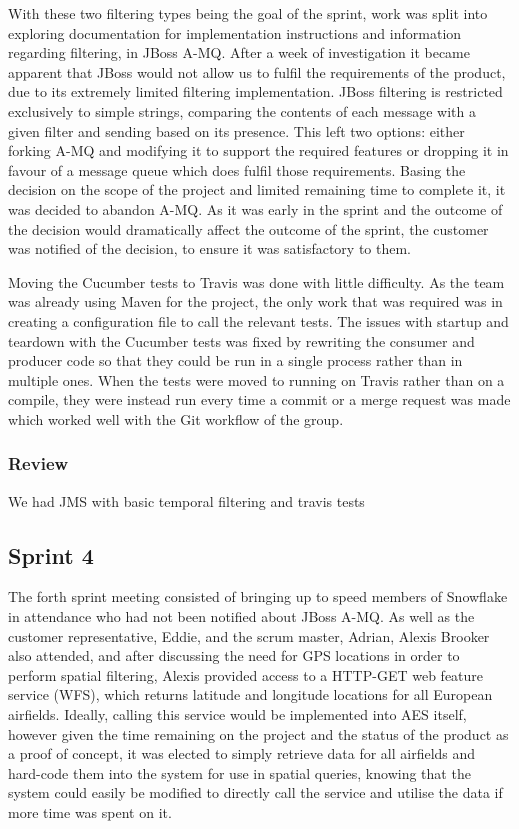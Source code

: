 \documentclass[a4paper, 12pt]{article}
\begin{document}
With these two filtering types being the goal of the sprint, work was split into exploring documentation for implementation instructions and information regarding filtering, in JBoss A-MQ. After a week of investigation it became apparent that JBoss would not allow us to fulfil the requirements of the product, due to its extremely limited filtering implementation. JBoss filtering is restricted exclusively to simple strings, comparing the contents of each message with a given filter and sending based on its presence. This left two options: either forking A-MQ and modifying it to support the required features or dropping it in favour of a message queue which does fulfil those requirements. Basing the decision on the scope of the project and limited remaining time to complete it, it was decided to abandon A-MQ. As it was early in the sprint and the outcome of the decision would dramatically affect the outcome of the sprint, the customer was notified of the decision, to ensure it was satisfactory to them.

Moving the Cucumber tests to Travis was done with little difficulty. As the team was already using Maven for the project, the only work that was required was in creating a configuration file to call the relevant tests. The issues with startup and teardown with the Cucumber tests was fixed by rewriting the consumer and producer code so that they could be run in a single process rather than in multiple ones. When the tests were moved to running on Travis rather than on a compile, they were instead run every time a commit or a merge request was made which worked well with the Git workflow of the group.

\subsubsection{Review}

We had JMS with basic temporal filtering and travis tests

\subsection{Sprint 4}

The forth sprint meeting consisted of bringing up to speed members of Snowflake in attendance who had not been notified about JBoss A-MQ. As well as the customer representative, Eddie, and the scrum master, Adrian, Alexis Brooker also attended, and after discussing the need for GPS locations in order to perform spatial filtering, Alexis provided access to a HTTP-GET web feature service (WFS), which returns latitude and longitude locations for all European airfields. Ideally, calling this service would be implemented into AES itself, however given the time remaining on the project and the status of the product as a proof of concept, it was elected to simply retrieve data for all airfields and hard-code them into the system for use in spatial queries, knowing that the system could easily be modified to directly call the service and utilise the data if more time was spent on it.
\end{document}
